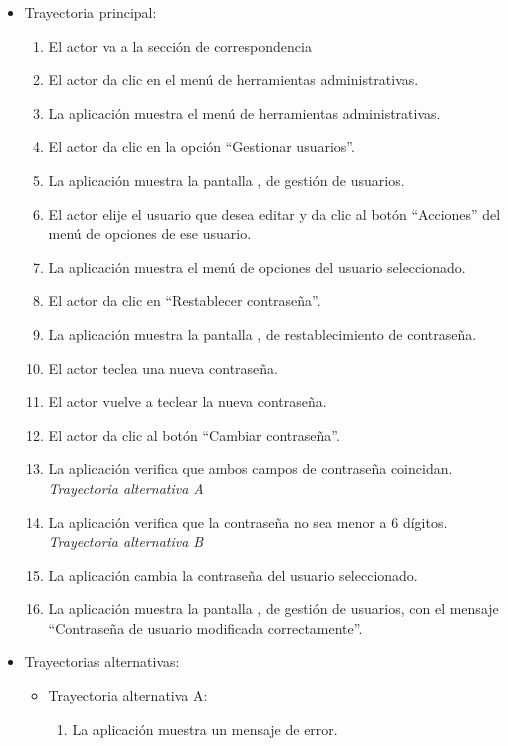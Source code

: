 			\begin{itemize}
				\item Trayectoria principal:
					\begin{enumerate}
						\item El actor va a la sección de correspondencia 
						\item El actor da clic en el menú de herramientas administrativas.
						\item La aplicación muestra el menú de herramientas administrativas.
						\item El actor da clic en la opción ``Gestionar usuarios''.
						\item La aplicación muestra la pantalla , de gestión de usuarios.
						\item El actor elije el usuario que desea editar y da clic al botón ``Acciones'' del menú de opciones de ese usuario.
						\item La aplicación muestra el menú de opciones del usuario seleccionado.
						\item El actor da clic en ``Restablecer contraseña''.
						\item La aplicación muestra la pantalla , de restablecimiento de contraseña.
						\item El actor teclea una nueva contraseña.
						\item El actor vuelve a teclear la nueva contraseña.
						\item El actor da clic al botón ``Cambiar contraseña''.
						\item La aplicación verifica que ambos campos de contraseña coincidan. \textsl{Trayectoria alternativa A}
						\item La aplicación verifica que la contraseña no sea menor a 6 dígitos. \textsl{Trayectoria alternativa B}
						\item La aplicación cambia la contraseña del usuario seleccionado.
						\item La aplicación muestra la pantalla , de gestión de usuarios, con el mensaje ``Contraseña de usuario modificada correctamente''.

					\end{enumerate}
				\item Trayectorias alternativas:
					\begin{itemize}
						\item Trayectoria alternativa A:
							\begin{enumerate}
								\item La aplicación muestra un mensaje de error.
							\end{enumerate}
					\end{itemize}
			\end{itemize}
			
